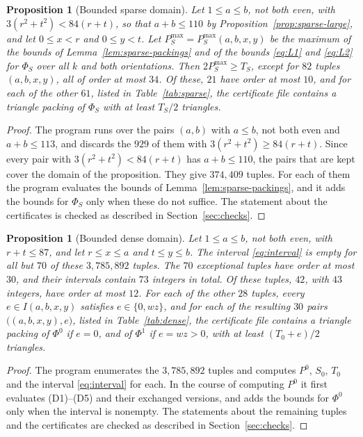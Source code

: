 \documentclass{amsart}
\newtheorem{proposition}[theorem]{Proposition}
\theoremstyle{definition}
\numberwithin{equation}{section}
\numberwithin{table}{section}
\begin{document}
\begin{proposition}[Bounded sparse domain]\label{prop:sparse-bounded}
Let $1\le a\le b$, not both even, with $3(r^2+t^2)<84(r+t)$, so that $a+b\le 110$ by Proposition~\ref{prop:sparse-large}, and let $0\le x<r$ and $0\le y<t$. Let $P_S^{\max}=P_S^{\max}(a,b,x,y)$ be the maximum of the bounds of Lemma~\ref{lem:sparse-packings} and of the bounds \eqref{eq:L1} and \eqref{eq:L2} for $\Phi_S$ over all $k$ and both orientations. Then $2P_S^{\max}\ge T_S$, except for $82$ tuples $(a,b,x,y)$, all of order at most $34$. Of these, $21$ have order at most $10$, and for each of the other $61$, listed in Table~\ref{tab:sparse}, the certificate file contains a triangle packing of $\Phi_S$ with at least $T_S/2$ triangles.
\end{proposition}

\begin{proof}
The program runs over the pairs $(a,b)$ with $a\le b$, not both even and $a+b\le 113$, and discards the $929$ of them with $3(r^2+t^2)\ge 84(r+t)$. Since every pair with $3(r^2+t^2)<84(r+t)$ has $a+b\le 110$, the pairs that are kept cover the domain of the proposition. They give $374{,}409$ tuples. For each of them the program evaluates the bounds of Lemma~\ref{lem:sparse-packings}, and it adds the bounds for $\Phi_S$ only when these do not suffice. The statement about the certificates is checked as described in Section~\ref{sec:checks}.
\end{proof}

\begin{proposition}[Bounded dense domain]\label{prop:dense-bounded}
Let $1\le a\le b$, not both even, with $r+t\le 87$, and let $r\le x\le a$ and $t\le y\le b$. The interval \eqref{eq:interval} is empty for all but $70$ of these $3{,}785{,}892$ tuples. The $70$ exceptional tuples have order at most $30$, and their intervals contain $73$ integers in total. Of these tuples, $42$, with $43$ integers, have order at most $12$. For each of the other $28$ tuples, every $e\in I(a,b,x,y)$ satisfies $e\in\{0,wz\}$, and for each of the resulting $30$ pairs $\bigl((a,b,x,y),e\bigr)$, listed in Table~\ref{tab:dense}, the certificate file contains a triangle packing of $\Phi^0$ if $e=0$, and of $\Phi^1$ if $e=wz>0$, with at least $(T_0+e)/2$ triangles.
\end{proposition}

\begin{proof}
The program enumerates the $3{,}785{,}892$ tuples and computes $P^0$, $S_0$, $T_0$ and the interval \eqref{eq:interval} for each. In the course of computing $P^0$ it first evaluates (D1)--(D5) and their exchanged versions, and adds the bounds for $\Phi^0$ only when the interval is nonempty. The statements about the remaining tuples and the certificates are checked as described in Section~\ref{sec:checks}.
\end{proof}
\end{document}
